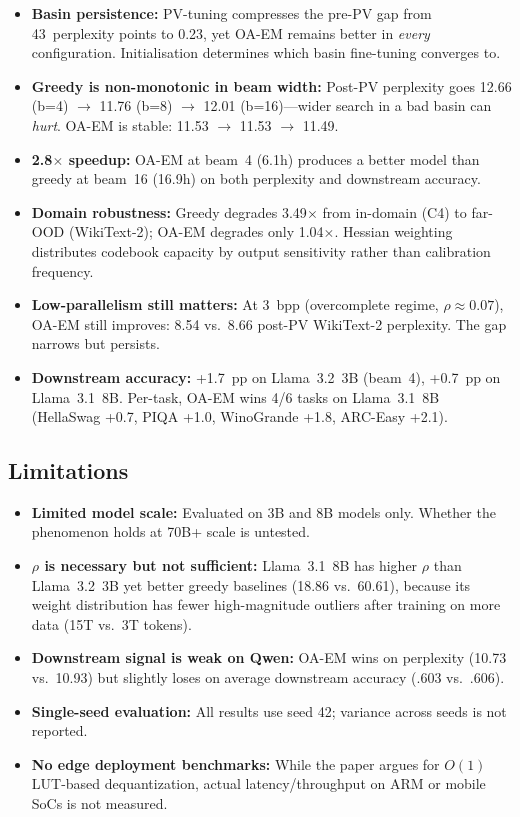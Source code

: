 \documentclass[11pt]{article}
\begin{document}
\begin{itemize}
    \item \textbf{Basin persistence:} PV-tuning compresses the pre-PV gap from 43~perplexity points to 0.23, yet OA-EM remains better in \textit{every} configuration. Initialisation determines which basin fine-tuning converges to.

    \item \textbf{Greedy is non-monotonic in beam width:} Post-PV perplexity goes 12.66 (b=4) $\to$ 11.76 (b=8) $\to$ 12.01 (b=16)---wider search in a bad basin can \textit{hurt}. OA-EM is stable: 11.53 $\to$ 11.53 $\to$ 11.49.

    \item \textbf{2.8$\times$ speedup:} OA-EM at beam~4 (6.1h) produces a better model than greedy at beam~16 (16.9h) on both perplexity and downstream accuracy.

    \item \textbf{Domain robustness:} Greedy degrades 3.49$\times$ from in-domain (C4) to far-OOD (WikiText-2); OA-EM degrades only 1.04$\times$. Hessian weighting distributes codebook capacity by output sensitivity rather than calibration frequency.

    \item \textbf{Low-parallelism still matters:} At 3~bpp (overcomplete regime, $\rho \approx 0.07$), OA-EM still improves: 8.54 vs.\ 8.66 post-PV WikiText-2 perplexity. The gap narrows but persists.

    \item \textbf{Downstream accuracy:} +1.7~pp on Llama~3.2~3B (beam~4), +0.7~pp on Llama~3.1~8B. Per-task, OA-EM wins 4/6 tasks on Llama~3.1~8B (HellaSwag +0.7, PIQA +1.0, WinoGrande +1.8, ARC-Easy +2.1).
\end{itemize}

\subsection{Limitations}

\begin{itemize}
    \item \textbf{Limited model scale:} Evaluated on 3B and 8B models only. Whether the phenomenon holds at 70B+ scale is untested.
    \item \textbf{$\rho$ is necessary but not sufficient:} Llama~3.1~8B has higher $\rho$ than Llama~3.2~3B yet better greedy baselines (18.86 vs.\ 60.61), because its weight distribution has fewer high-magnitude outliers after training on more data (15T vs.\ 3T tokens).
    \item \textbf{Downstream signal is weak on Qwen:} OA-EM wins on perplexity (10.73 vs.\ 10.93) but slightly loses on average downstream accuracy (.603 vs.\ .606).
    \item \textbf{Single-seed evaluation:} All results use seed 42; variance across seeds is not reported.
    \item \textbf{No edge deployment benchmarks:} While the paper argues for $O(1)$ LUT-based dequantization, actual latency/throughput on ARM or mobile SoCs is not measured.
\end{itemize}
\end{document}
